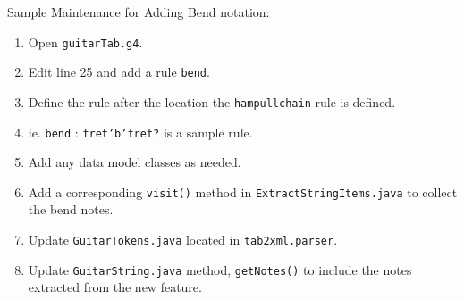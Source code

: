 \documentclass[11pt]{article}
\begin{document}
Sample Maintenance for Adding Bend notation:
\begin{enumerate}
\item Open \texttt{guitarTab.g4}.
\item Edit line 25 and add a rule \texttt{bend}.
\item Define the rule after the location the \texttt{hampullchain} rule is defined.
\item ie. \texttt{bend} : \texttt{fret'b'fret?} is a sample rule.
\item Add any data model classes as needed.
\item Add a corresponding \texttt{visit()} method in \texttt{ExtractStringItems.java} to collect the bend notes.
\item Update \texttt{GuitarTokens.java} located in \texttt{tab2xml.parser}.
\item Update \texttt{GuitarString.java} method, \texttt{getNotes()} to include the notes extracted from the new feature.
\end{enumerate}
\end{document}
